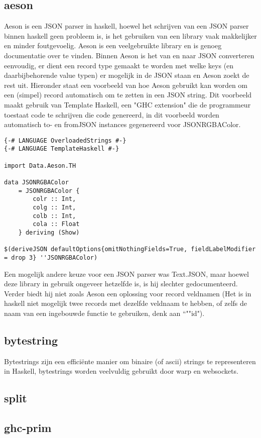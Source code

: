 \subsection{aeson}
Aeson is een JSON parser in haskell, hoewel het schrijven van een JSON parser binnen haskell geen probleem is, is het gebruiken van een library vaak makkelijker en minder foutgevoelig. Aeson is een veelgebruikte library en is genoeg documentatie over te vinden. Binnen Aeson is het van en naar JSON converteren eenvoudig, er dient een record type gemaakt te worden met welke keys (en daarbijbehorende value typen) er mogelijk in de JSON staan en Aeson zoekt de rest uit. Hieronder staat een voorbeeld van hoe Aeson gebruikt kan worden om een (simpel) record automatisch om te zetten in een JSON string. Dit voorbeeld maakt gebruik van Template Haskell, een "GHC extension" die de programmeur toestaat code te schrijven die code genereerd, in dit voorbeeld worden automatisch to- en fromJSON instances gegenereerd voor JSONRGBAColor.
\begin{lstlisting}
{-# LANGUAGE OverloadedStrings #-}
{-# LANGUAGE TemplateHaskell #-}

import Data.Aeson.TH

data JSONRGBAColor
    = JSONRGBAColor {
        colr :: Int,
        colg :: Int,
        colb :: Int,
        cola :: Float
    } deriving (Show)

$(deriveJSON defaultOptions{omitNothingFields=True, fieldLabelModifier = drop 3} ''JSONRGBAColor)
\end{lstlisting}
Een mogelijk andere keuze voor een JSON parser was Text.JSON, maar hoewel deze library in gebruik ongeveer hetzelfde is, is hij slechter gedocumenteerd. Verder biedt hij niet zoals Aeson een oplossing voor record veldnamen (Het is in haskell niet mogelijk twee records met dezelfde veldnaam te hebben, of zelfs de naam van een ingebouwde functie te gebruiken, denk aan ``""id").
\subsection{bytestring}
Bytestrings zijn een efficiënte manier om binaire (of ascii) strings te representeren in Haskell, bytestrings worden veelvuldig gebruikt door warp en websockets.
\subsection{split}
\subsection{ghc-prim}
